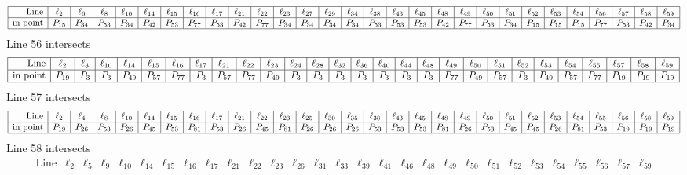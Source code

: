 \documentclass{article}
\begin{document}
{$$\begin{array}{|r*{28}{|c}|}
\hline
\mbox{Line}  & \ell_{2} & \ell_{6} & \ell_{8} & \ell_{10} & \ell_{14} & \ell_{15} & \ell_{16} & \ell_{17} & \ell_{21} & \ell_{22} & \ell_{23} & \ell_{27} & \ell_{29} & \ell_{34} & \ell_{38} & \ell_{43} & \ell_{45} & \ell_{48} & \ell_{49} & \ell_{50} & \ell_{51} & \ell_{52} & \ell_{53} & \ell_{54} & \ell_{56} & \ell_{57} & \ell_{58} & \ell_{59}\\
\hline
\mbox{in point}  & P_{15} & P_{34} & P_{53} & P_{34} & P_{42} & P_{53} & P_{77} & P_{53} & P_{42} & P_{77} & P_{34} & P_{34} & P_{34} & P_{34} & P_{53} & P_{53} & P_{53} & P_{42} & P_{77} & P_{53} & P_{34} & P_{15} & P_{15} & P_{15} & P_{77} & P_{53} & P_{42} & P_{34}\\
\hline
\end{array}
$$
Line 56 intersects 
$$
\begin{array}{|r*{27}{|c}|}
\hline
\mbox{Line}  & \ell_{2} & \ell_{3} & \ell_{10} & \ell_{14} & \ell_{15} & \ell_{16} & \ell_{17} & \ell_{21} & \ell_{22} & \ell_{23} & \ell_{24} & \ell_{28} & \ell_{32} & \ell_{36} & \ell_{40} & \ell_{44} & \ell_{48} & \ell_{49} & \ell_{50} & \ell_{51} & \ell_{52} & \ell_{53} & \ell_{54} & \ell_{55} & \ell_{57} & \ell_{58} & \ell_{59}\\
\hline
\mbox{in point}  & P_{19} & P_{3} & P_{3} & P_{49} & P_{57} & P_{77} & P_{3} & P_{57} & P_{77} & P_{49} & P_{3} & P_{3} & P_{3} & P_{3} & P_{3} & P_{3} & P_{3} & P_{77} & P_{49} & P_{57} & P_{3} & P_{49} & P_{57} & P_{77} & P_{19} & P_{19} & P_{19}\\
\hline
\end{array}
$$
Line 57 intersects 
$$
\begin{array}{|r*{28}{|c}|}
\hline
\mbox{Line}  & \ell_{2} & \ell_{4} & \ell_{8} & \ell_{10} & \ell_{14} & \ell_{15} & \ell_{16} & \ell_{17} & \ell_{21} & \ell_{22} & \ell_{23} & \ell_{25} & \ell_{30} & \ell_{35} & \ell_{38} & \ell_{43} & \ell_{45} & \ell_{48} & \ell_{49} & \ell_{50} & \ell_{51} & \ell_{52} & \ell_{53} & \ell_{54} & \ell_{55} & \ell_{56} & \ell_{58} & \ell_{59}\\
\hline
\mbox{in point}  & P_{19} & P_{26} & P_{53} & P_{26} & P_{45} & P_{53} & P_{81} & P_{53} & P_{26} & P_{45} & P_{81} & P_{26} & P_{26} & P_{26} & P_{53} & P_{53} & P_{53} & P_{81} & P_{26} & P_{53} & P_{45} & P_{45} & P_{26} & P_{81} & P_{53} & P_{19} & P_{19} & P_{19}\\
\hline
\end{array}
$$
Line 58 intersects 
$$
\begin{array}{|r*{28}{|c}|}
\hline
\mbox{Line}  & \ell_{2} & \ell_{5} & \ell_{9} & \ell_{10} & \ell_{14} & \ell_{15} & \ell_{16} & \ell_{17} & \ell_{21} & \ell_{22} & \ell_{23} & \ell_{26} & \ell_{31} & \ell_{33} & \ell_{39} & \ell_{41} & \ell_{46} & \ell_{48} & \ell_{49} & \ell_{50} & \ell_{51} & \ell_{52} & \ell_{53} & \ell_{54} & \ell_{55} & \ell_{56} & \ell_{57} & \ell_{59}\\

\end{array}$$}
\end{document}
